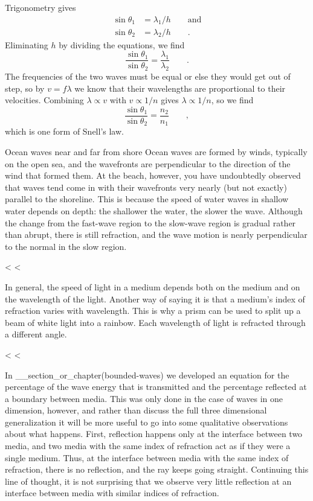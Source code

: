Trigonometry gives
\begin{align*}
\sin \theta_1 &= \lambda_1/h \qquad  \text{and} \\
\sin \theta_2 &= \lambda_2/h \qquad .
\end{align*}
Eliminating $h$ by dividing the equations, we find
\begin{equation*}
 \frac{\sin\theta_1}{\sin\theta_2}=\frac{\lambda_1}{\lambda_2}\qquad .
\end{equation*}
The frequencies of the two waves must be equal or else they
would get out of step, so by $v=f\lambda $ we know that
their wavelengths are proportional to their velocities.
Combining $\lambda\propto v$ with $v\propto 1/n$ gives $\lambda\propto 1/n$, so we find
\begin{equation*}
 \frac{\sin\theta_1}{\sin\theta_2}=\frac{n_2}{n_1} \qquad ,
\end{equation*}
which is one form of Snell's law.

\begin{eg}{Ocean waves near and far from shore}
Ocean waves are formed by winds, typically on the open sea,
and the wavefronts are perpendicular to the direction of the
wind that formed them. At the beach, however, you have
undoubtedly observed that waves tend come in with their
wavefronts very nearly (but not exactly) parallel to the
shoreline. This is because the speed of water waves in
shallow water depends on depth: the shallower the water, the
slower the wave. Although the change from the fast-wave
region to the slow-wave region is gradual rather than
abrupt, there is still refraction, and the wave motion is
nearly perpendicular to the normal in the slow region.
\end{eg}

<%
<%

In general, the speed of light in a medium depends both on
the medium and on the wavelength of the light. Another way
of saying it is that a medium's index of refraction varies
with wavelength. This is why a prism can be used to split up
a beam of white light into a rainbow. Each wavelength of
light is refracted through a different angle.

<%
<%

In __section_or_chapter(bounded-waves) we developed an equation for the percentage of the
wave energy that is transmitted and the percentage reflected
at a boundary between media. This was only done in the case
of waves in one dimension, however, and rather than discuss
the full three dimensional generalization it will be more
useful to go into some qualitative observations about what
happens. First, reflection happens only at the interface
between two media, and two media with the same index of
refraction act as if they were a single medium. Thus, at the
interface between media with the same index of refraction,
there is no reflection, and the ray keeps going straight.
Continuing this line of thought, it is not surprising that
we observe very little reflection at an interface between
media with similar indices of refraction.

